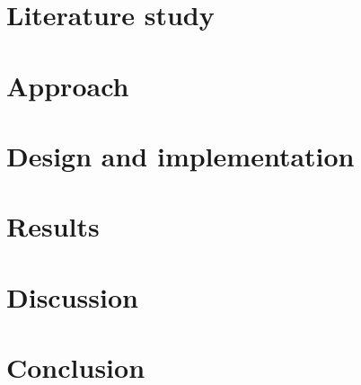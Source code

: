\documentclass{epr400}
\begin{document}
\maketitlepage


\pagestyle{plain}

\vspace*{0.5cm}


\newpage

\tableofcontents
\newpage


\newpage



\newpage

\setcounter{page}{1}


\section{Literature study}

\newpage

\section{Approach}

\newpage

\section{Design and implementation}

\newpage

\section{Results}

\newpage

\section{Discussion}

\newpage

\section{Conclusion}

\newpage
\end{document}
